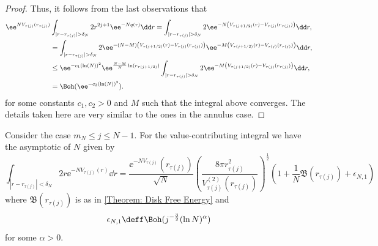 \begin{proof}
Thus, it follows from the last observations that
\begin{align}
	\ee^{N V_{\tau(j)}(r_{\tau(j)})} & \int_{|r - r_{\tau(j)}| > \delta_N} 2 r^{2j + 1} \ee^{-N q(r)}  \dd r = \int_{|r - r_{\tau(j)}| > \delta_N} 2 \ee^{-N \left( V_{\tau(j + 1/2)}(r) - V_{\tau(j)}(r_{\tau(j)}) \right)} \dd r, \\	
	& = \int_{|r - r_{\tau(j)}| > \delta_N} 2 \ee^{-(N-M) \left( V_{\tau(j + 1/2)}(r) - V_{\tau(j)}(r_{\tau(j)}) \right)} \ee^{-M \left( V_{\tau(j + 1/2)}(r) - V_{\tau(j)}(r_{\tau(j)}) \right)} \dd r, \\	
	& \leq \ee^{-c_1 (\ln(N))^2} \ee^{\frac{N - M}{N} \ln(r_{\tau(j+1/2)})}  \int_{|r - r_{\tau(j)}| > \delta_N} 2 \ee^{-M \left( V_{\tau(j + 1/2)}(r) - V_{\tau(j)}(r_{\tau(j)}) \right)} \dd r, \\
	& = \Boh(\ee^{-c_2 (\ln(N))^2}).
\end{align}
for some constants $c_1, c_2 > 0$ and $M$ such that the integral above converges. The details taken here are very similar to the ones in the annulus case.
\end{proof}


\begin{lema} \label{Lemma: mn - N value contributing}
	Consider the case $m_N \leq j \leq N-1$. For the value-contributing integral we have the asymptotic of $N$ given by
	\begin{equation}
		\int_{|r - r_{\tau(j)}| < \delta_N} 2 r \ee^{-N V_{\tau(j)}(r)} \dd r= \frac{\ee^{-N V_{\tau(j)}}(r_{\tau(j)})}{\sqrt{N}} \left( \frac{8\pi r^2_{\tau(j)}}{V^{(2)}_{\tau(j)}(r_{\tau(j)})} \right)^{\frac{1}{2}} \left( 1 + \frac{1}{N} \mathfrak{B}(r_{\tau(j)}) + \epsilon_{N, 1} \right)
	\end{equation}
	where $\mathfrak{B}(r_{\tau(j)})$ is as in \autoref{Theorem: Disk Free Energy}	and
	\begin{equation}
		\epsilon_{N,1} \deff \Boh(j^{-\frac{3}{2}} (\ln N)^\alpha)
	\end{equation}
	for some $\alpha > 0$.
\end{lema}

